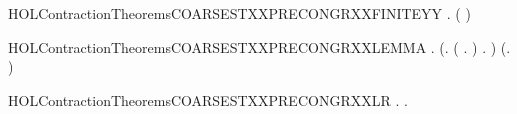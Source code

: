 \newcommand{\HOLContractionTheoremsCOARSESTXXPRECONGRXXFINITE}{\UseVerbatim{HOLContractionTheoremsCOARSESTXXPRECONGRXXFINITE}}
\begin{SaveVerbatim}{HOLContractionTheoremsCOARSESTXXPRECONGRXXFINITEYY}
\HOLTokenTurnstile{} \HOLSymConst{\HOLTokenForall{}} .
         \HOLSymConst{\HOLTokenConj{}}   \HOLSymConst{\HOLTokenImp{}}
       (   \HOLSymConst{\HOLTokenEquiv{}}   )
\end{SaveVerbatim}
\newcommand{\HOLContractionTheoremsCOARSESTXXPRECONGRXXFINITEYY}{\UseVerbatim{HOLContractionTheoremsCOARSESTXXPRECONGRXXFINITEYY}}
\begin{SaveVerbatim}{HOLContractionTheoremsCOARSESTXXPRECONGRXXLEMMA}
\HOLTokenTurnstile{} \HOLSymConst{\HOLTokenForall{}} .
       (\HOLSymConst{\HOLTokenExists{}}.
              \HOLSymConst{\HOLTokenConj{}} (\HOLSymConst{\HOLTokenForall{}} .  \HOLTokenWeakTransBegin{}\HOLTokenWeakTransEnd {} \HOLSymConst{\HOLTokenImp{}} \HOLSymConst{\HOLTokenNeg{}}  ) \HOLSymConst{\HOLTokenConj{}}
            \HOLSymConst{\HOLTokenForall{}} .  \HOLTokenWeakTransBegin{}\HOLTokenWeakTransEnd {} \HOLSymConst{\HOLTokenImp{}} \HOLSymConst{\HOLTokenNeg{}}  ) \HOLSymConst{\HOLTokenImp{}}
       (\HOLSymConst{\HOLTokenForall{}}.  \HOLSymConst{\ensuremath{+}}    \HOLSymConst{\ensuremath{+}} ) \HOLSymConst{\HOLTokenImp{}}
         
\end{SaveVerbatim}
\newcommand{\HOLContractionTheoremsCOARSESTXXPRECONGRXXLEMMA}{\UseVerbatim{HOLContractionTheoremsCOARSESTXXPRECONGRXXLEMMA}}
\begin{SaveVerbatim}{HOLContractionTheoremsCOARSESTXXPRECONGRXXLR}
\HOLTokenTurnstile{} \HOLSymConst{\HOLTokenForall{}} .    \HOLSymConst{\HOLTokenImp{}} \HOLSymConst{\HOLTokenForall{}}.  \HOLSymConst{\ensuremath{+}}    \HOLSymConst{\ensuremath{+}} 
\end{SaveVerbatim}
